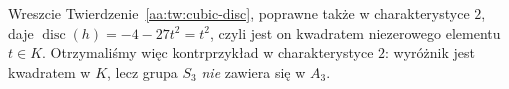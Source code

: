 \begin{przyklad}
Wreszcie Twierdzenie~\ref{aa:tw:cubic-disc},
poprawne także w charakterystyce $2$, daje
$\operatorname{disc}(h)=-4-27t^2=t^2$,
czyli jest on kwadratem niezerowego elementu $t\in K$.
Otrzymaliśmy więc kontrprzykład w charakterystyce $2$:
wyróżnik jest kwadratem w $K$, lecz grupa $S_3$
\emph{nie} zawiera się w $A_3$.
\end{przyklad}

